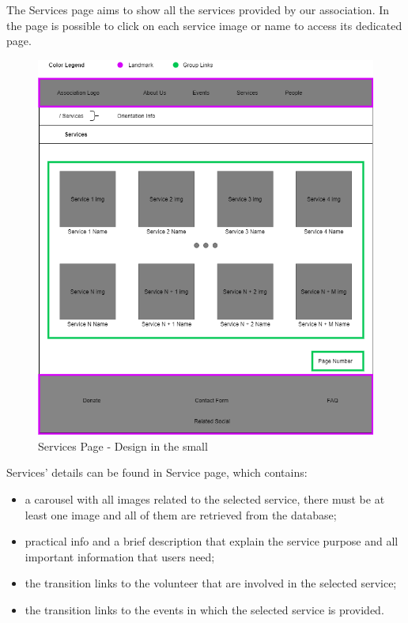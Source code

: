 The Services page aims to show all the services provided by our association. In the page is possible to click on each service image or name to access its dedicated page.

\begin{figure}[h!]
		\centering
		\begin{minipage}[b]{1\textwidth}
    			\includegraphics[width=\textwidth]{./assets/services.png}
			\caption{Services Page - Design in the small}
		\end{minipage}
	\end{figure}
\FloatBarrier
\vspace{1cm}
\hspace{-1cm}
Services' details can be found in Service page, which contains:
\begin{itemize}
	\item a carousel with all images related to the selected service, there must be at least one image and all of them are retrieved 			from the database;
	\item practical info and a brief description that explain the service purpose and all important information that users need;
	\item the transition links to the volunteer that are involved in the selected service;
	\item the transition links to the events in which the selected service is provided.
\end{itemize} 

